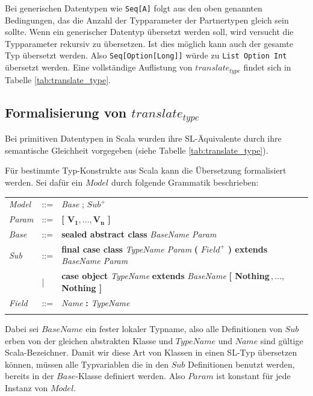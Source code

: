 \documentclass[12pt,bibtotoc]{scrreprt}
\begin{document}
Bei generischen Datentypen wie \lstinline!Seq[A]! folgt aus den oben genannten Bedingungen, das die Anzahl der Typparameter der Partnertypen gleich sein sollte. Wenn ein generischer Datentyp übersetzt werden soll, wird versucht die Typparameter rekursiv zu übersetzen. Ist dies möglich kann auch der gesamte Typ übersetzt werden. Also \lstinline!Seq[Option[Long]]! würde zu \lstinline!List Option Int! übersetzt werden. Eine vollständige Auflistung von $translate_{type}$ findet sich in Tabelle \ref{tab:translate_type}.

\subsection{Formalisierung von $translate_{type}$}
\label{subsec:formal-translate-typ}

Bei primitiven Datentypen in Scala wurden ihre SL-Äquivalente durch ihre semantische Gleichheit vorgegeben (siehe Tabelle \ref{tab:translate_type}). 

Für bestimmte Typ-Konstrukte aus Scala kann die Übersetzung formalisiert werden. Sei dafür ein $Model$ durch folgende Grammatik beschrieben:

\begin{tabular}{lll}
\emph{Model} & ::= & \emph{Base} ; \emph{$Sub^+$}\\
\emph{Param} & ::= & \textbf{[ $\mathbf{V_1, \dots ,V_n}$ ]}\\
\emph{Base}  & ::= & \textbf{sealed abstract class} \emph{BaseName Param}\\
\emph{Sub}   & ::=   & \textbf{final case class} \emph{TypeName Param} \textbf{(} $Field^+$ \textbf{) extends} \emph{BaseName Param}\\
 & | & \textbf{case object} \emph{TypeName} \textbf{extends} \emph{BaseName} \textbf{[ Nothing$\,,\dots,\,$Nothing ]}\\
\emph{Field} & ::= & \emph{Name} \textbf{:} \emph{TypeName}\\
\\
\end{tabular}

Dabei sei $BaseName$ ein fester lokaler Typname, also alle Definitionen von $Sub$ erben von der gleichen abstrakten Klasse und $TypeName$ und $Name$ sind gültige Scala-Bezeichner. Damit wir diese Art von Klassen in einen SL-Typ übersetzen können, müssen alle Typvariablen die in den $Sub$ Definitionen benutzt werden, bereits in der $Base$-Klasse definiert werden. Also $Param$ ist konstant für jede Instanz von $Model$.
\end{document}
